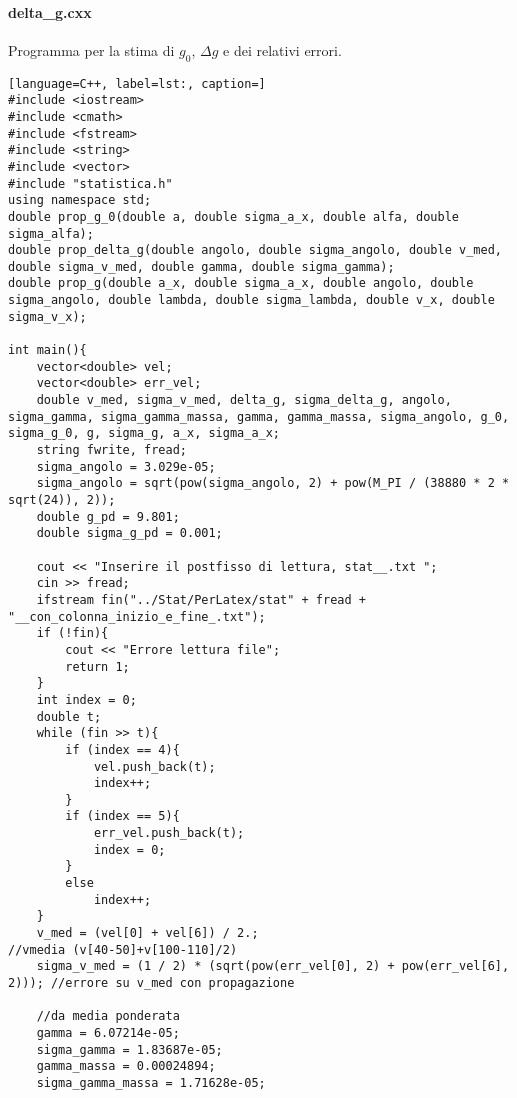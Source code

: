 \documentclass[a4paper,11pt,oneside]{article}
\begin{document}
\paragraph{delta_g.cxx} Programma per la stima di $g_0$, $\Delta g$ e dei relativi errori.
\begin{lstlisting}[language=C++, label=lst:, caption=]
#include <iostream>
#include <cmath>
#include <fstream>
#include <string>
#include <vector>
#include "statistica.h"
using namespace std;
double prop_g_0(double a, double sigma_a_x, double alfa, double sigma_alfa);
double prop_delta_g(double angolo, double sigma_angolo, double v_med, double sigma_v_med, double gamma, double sigma_gamma);
double prop_g(double a_x, double sigma_a_x, double angolo, double sigma_angolo, double lambda, double sigma_lambda, double v_x, double sigma_v_x);

int main(){
	vector<double> vel;
	vector<double> err_vel;
	double v_med, sigma_v_med, delta_g, sigma_delta_g, angolo, sigma_gamma, sigma_gamma_massa, gamma, gamma_massa, sigma_angolo, g_0, sigma_g_0, g, sigma_g, a_x, sigma_a_x;
	string fwrite, fread;
	sigma_angolo = 3.029e-05;
	sigma_angolo = sqrt(pow(sigma_angolo, 2) + pow(M_PI / (38880 * 2 * sqrt(24)), 2));
	double g_pd = 9.801;
	double sigma_g_pd = 0.001;

	cout << "Inserire il postfisso di lettura, stat__.txt ";
	cin >> fread;
	ifstream fin("../Stat/PerLatex/stat" + fread + "__con_colonna_inizio_e_fine_.txt");
	if (!fin){
		cout << "Errore lettura file";
		return 1;
	}
	int index = 0;
	double t;
	while (fin >> t){
		if (index == 4){
			vel.push_back(t);
			index++;
		}
		if (index == 5){
			err_vel.push_back(t);
			index = 0;
		}
		else
			index++;
	}
	v_med = (vel[0] + vel[6]) / 2.;											 //vmedia (v[40-50]+v[100-110]/2)
	sigma_v_med = (1 / 2) * (sqrt(pow(err_vel[0], 2) + pow(err_vel[6], 2))); //errore su v_med con propagazione

	//da media ponderata
	gamma = 6.07214e-05;
	sigma_gamma = 1.83687e-05;
	gamma_massa = 0.00024894;
	sigma_gamma_massa = 1.71628e-05;


\end{lstlisting}
\end{document}
